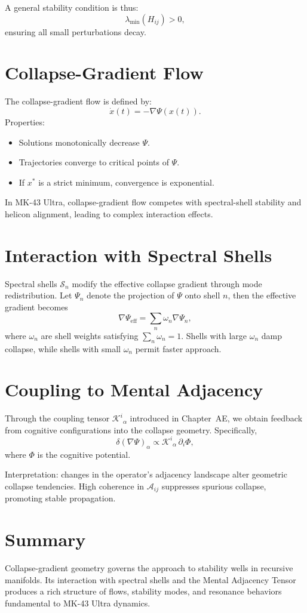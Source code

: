 A general stability condition is thus:
\[
\lambda_{\min}(H_{ij}) > 0,
\]
ensuring all small perturbations decay.

\section{Collapse-Gradient Flow}
The collapse-gradient flow is defined by:
\[
\dot{x}(t) = -\nabla \Psi(x(t)).
\]
Properties:
\begin{itemize}
  \item Solutions monotonically decrease $\Psi$.
  \item Trajectories converge to critical points of $\Psi$.
  \item If $x^\ast$ is a strict minimum, convergence is exponential.
\end{itemize}

In MK-43 Ultra, collapse-gradient flow competes with spectral-shell stability and helicon alignment, leading to complex interaction effects.

\section{Interaction with Spectral Shells}
Spectral shells $\mathcal{S}_n$ modify the effective collapse gradient through mode redistribution. Let $\Psi_n$ denote the projection of $\Psi$ onto shell $n$, then the effective gradient becomes
\[
\nabla \Psi_{\mathrm{eff}} = \sum_n \omega_n \nabla \Psi_n,
\]
where $\omega_n$ are shell weights satisfying $\sum_n \omega_n = 1$. Shells with large $\omega_n$ damp collapse, while shells with small $\omega_n$ permit faster approach.

\section{Coupling to Mental Adjacency}
Through the coupling tensor $\mathcal{K}^{i}{}_{\alpha}$ introduced in Chapter~AE, we obtain feedback from cognitive configurations into the collapse geometry. Specifically,
\[
\delta (\nabla \Psi)_\alpha \propto \mathcal{K}^{i}{}_{\alpha} \,\partial_i \Phi,
\]
where $\Phi$ is the cognitive potential.

Interpretation: changes in the operator's adjacency landscape alter geometric collapse tendencies. High coherence in $\mathcal{A}_{ij}$ suppresses spurious collapse, promoting stable propagation.

\section{Summary}
Collapse-gradient geometry governs the approach to stability wells in recursive manifolds. Its interaction with spectral shells and the Mental Adjacency Tensor produces a rich structure of flows, stability modes, and resonance behaviors fundamental to MK-43 Ultra dynamics.
